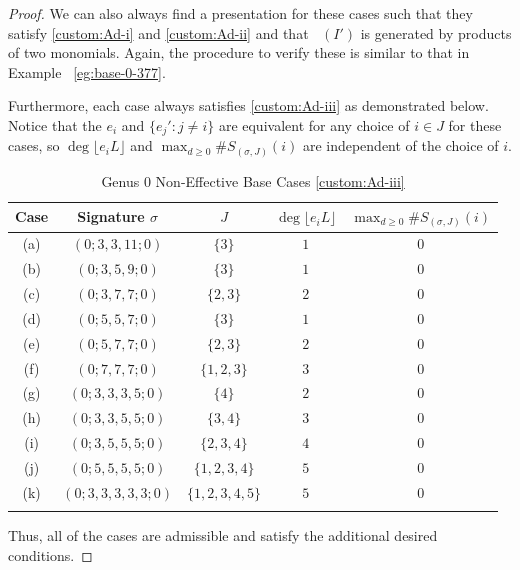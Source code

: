 \documentclass{amsart}
\theoremstyle{plain}
\theoremstyle{definition}
\theoremstyle{remark}
\numberwithin{equation}{section}
\DeclareMathOperator{\initial}{in_\prec}
\begin{document}
\begin{proof}
We can also always find a presentation for these cases such that
they satisfy \ref{custom:Ad-i} and \ref{custom:Ad-ii} and that $\initial(I')$ is
generated by products of two monomials. Again, the procedure to
verify these is similar to that in Example
~\ref{eg:base-0-377}.

Furthermore, each case always satisfies \ref{custom:Ad-iii} as demonstrated below.
Notice that the $e_i$ and $\{e_j' : j \neq i\}$ are equivalent
for any choice of $i \in J$ for these cases, so $\deg \lfloor e_i L
\rfloor$ and $\max_{d \geq 0} \#S_{(\sigma, J)}(i)$ are
independent of the choice of $i$.

\begin{longtable}
	{| c | c | c || c | c |}
	\hline
	Case & Signature $\sigma$ & $J$ & $\deg \lfloor e_i L \rfloor$ &
	$\max_{d \geq 0} \#S_{(\sigma, J)}(i)$ \\
	\hline
	\hline

	(a) & $(0; 3, 3, 11; 0)$ & $\{3\}$ & $1$ & $0$ \\	\hline
	
	(b) & $(0; 3, 5, 9; 0)$ & $\{3\}$ & $1$ & $0$ \\ \hline
	
	(c) & $(0; 3, 7, 7; 0)$ & $\{2, 3\}$ & $2$ & $0$ \\ \hline
	
	(d) & $(0; 5, 5, 7; 0)$ & $\{3\}$ & $1$ & $0$ \\ \hline
	
	(e) & $(0; 5, 7, 7; 0)$ & $\{2, 3\}$ & $2$ & $0$ \\ \hline

	(f) & $(0; 7, 7, 7; 0)$ & $\{1, 2, 3\}$ & $3$ & $0$ \\ \hline

	(g) & $(0; 3, 3, 3, 5; 0)$ & $\{4\}$ & $2$ & $0$ \\ \hline
	
	(h) & $(0; 3, 3, 5, 5; 0)$ & $\{3, 4\}$ & $3$ & $0$ \\ \hline
	
	(i) & $(0; 3, 5, 5, 5; 0)$ & $\{2, 3, 4\}$ & $4$ & $0$ \\ \hline
	
	(j) & $(0; 5, 5, 5, 5; 0)$ & $\{1, 2, 3, 4\}$ & $5$ & $0$ \\ \hline

	(k) & $(0; 3, 3, 3, 3, 3; 0)$ & $\{1, 2, 3, 4, 5\}$ & $5$ & $0$ \\ \hline
	
	\caption{Genus 0 Non-Effective Base Cases \ref{custom:Ad-iii}}
	\label{table:g-0-base-cases-admissibility}
\end{longtable}

Thus, all of the cases are admissible and satisfy the additional
desired conditions.
\end{proof}
\end{document}

